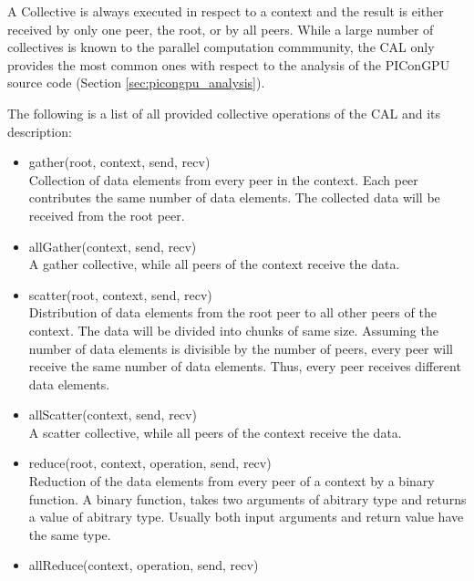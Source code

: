 A Collective is always executed in respect to a context and the result
is either received by only one peer, the root, or by all peers.  While
a large number of collectives is known to the parallel computation
commmunity, the CAL only provides the most common ones with respect to
the analysis of the PIConGPU source code (Section \ref{sec:picongpu_analysis}).

The following is a list of all provided collective operations of the
CAL and its description:
\begin{itemize}
\item gather(root, context, send, recv)\\

  Collection of data elements from every peer in the context. Each peer
  contributes the same number of data elements. The collected data will
  be received from the root peer.

\item allGather(context, send, recv)\\

  A gather collective, while all peers of the context receive the data.

\item scatter(root, context, send, recv)\\

  Distribution of data elements from the root peer to all other peers of
  the context. The data will be divided into chunks of same
  size. Assuming the number of data elements is divisible by the number
  of peers, every peer will receive the same number of data
  elements. Thus, every peer receives different data elements.

\item allScatter(context, send, recv)\\

  A scatter collective, while all peers of the context receive the data.

\item reduce(root, context, operation, send, recv)\\

  Reduction of the data elements from every peer of a context by a
  binary function. A binary function, takes two arguments of abitrary
  type and returns a value of abitrary type. Usually both input
  arguments and return value have the same type.

\item allReduce(context, operation, send, recv)\\


\end{itemize}
